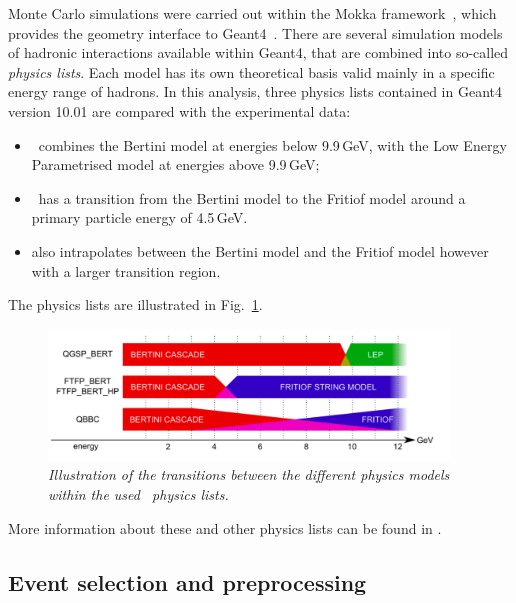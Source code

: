 Monte Carlo simulations were carried out within the Mokka framework~\cite{MoradeFreitas:2002kj}, which provides the geometry interface to {\sc Geant}4~\cite{Allison:2006ve}. 
There are several simulation models of hadronic interactions available within {\sc Geant}4, that are combined into so-called \textit{physics lists}.
Each model has its own theoretical basis valid mainly in a specific energy range of hadrons. In this analysis, three physics lists contained in {\sc Geant4} version 10.01 are compared with the experimental data:
\begin{itemize}
	\item \qgsp\ combines the Bertini model
	at energies below 9.9\,GeV, with the Low Energy Parametrised model at energies above 9.9\,GeV;
	\item \ftfp\ has a transition from the Bertini model to the Fritiof model around a primary particle energy of 4.5\,GeV.
	\item \qbbc also intrapolates between the Bertini model and the Fritiof model however with a larger transition region.
\end{itemize}
The physics lists are illustrated in Fig.~\ref{fig:physicslist_2}.
\begin{figure}
	\centering
	\includegraphics[width=0.95\textwidth]{ECAL/graphics/physics-lists.png}
	\caption{\label{fig:physicslist_2} \sl Illustration of the transitions between the different physics models within the used \geant\ physics lists.  }
\end{figure}
More information about these and other physics lists can be found in \cite{bib:G4pl}.

\subsection{Event selection and preprocessing}

